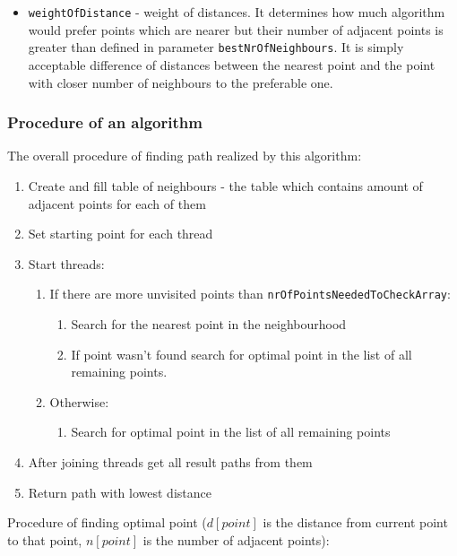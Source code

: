 \documentclass[titlepage]{article}
\begin{document}
\begin{itemize}
	\item \texttt{weightOfDistance} - weight of distances. It determines how much algorithm would prefer points which are nearer but their number of adjacent points is greater than defined in parameter \texttt{bestNrOfNeighbours}. It is simply acceptable difference of distances between the nearest point and the point with closer number of neighbours to the preferable one.
	
\end{itemize}

\subsubsection{Procedure of an algorithm}

The overall procedure of finding path realized by this algorithm:

\begin{enumerate}
	\item Create and fill table of neighbours - the table which contains amount of adjacent points for each of them
	\item Set starting point for each thread
	\item Start threads:
	\begin{enumerate}[label*=\arabic*.]
		\item If there are more unvisited points than \texttt{nrOfPointsNeededToCheckArray}:
		\begin{enumerate}[label*=\arabic*.]
			\item Search for the nearest point in the neighbourhood
			\item If point wasn't found search for optimal point in the list of all remaining points.
		\end{enumerate}
		\item Otherwise:
		\begin{enumerate}[label*=\arabic*.]
			\item Search for optimal point in the list of all remaining points
		\end{enumerate}
	\end{enumerate}
	\item After joining threads get all result paths from them
	\item Return path with lowest distance
\end{enumerate}

Procedure of finding optimal point ($d[point]$ is the distance from current point to that point, $n[point]$ is the number of adjacent points):
\end{document}
